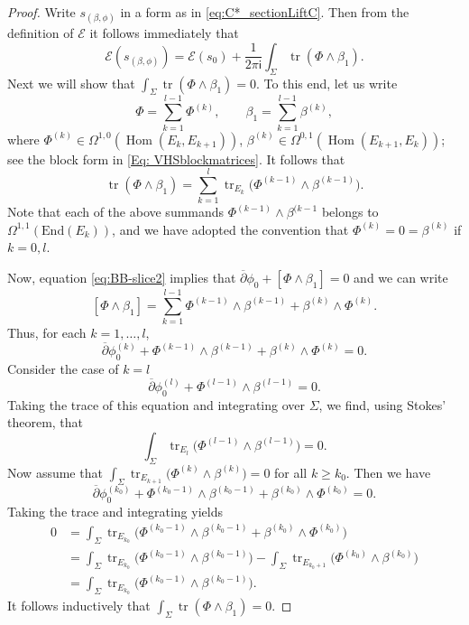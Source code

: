 \documentclass[pdftex]{sigma}
\numberwithin{equation}{section}
\theoremstyle{definition}
\renewcommand{\i}{\mathsf{i}}
\begin{document}
\begin{proof}
Write $s_{(\beta,\phi)}$ in a form as in \eqref{eq:C*_sectionLiftC}. Then from the definition of
$\mathcal{E}$ it follows immediately that
\[
\mathcal{E}(s_{(\beta,\phi)}) = \mathcal{E}(s_0)+\frac{1}{2\pi \i} \int_\Sigma \operatorname{tr}(\Phi \wedge \beta_1).
\]
Next we will show that $\int_\Sigma \operatorname{tr}(\Phi \wedge \beta_1) = 0$. To this end, let us write
\[
\Phi = \sum_{k=1}^{l-1}\Phi^{(k)},\qquad \beta_1 = \sum_{k=1}^{l-1}\beta^{(k)},
\]
where $\Phi^{(k)} \in \Omega^{1,0}(\operatorname{Hom}(E_k, E_{k+1}))$, $ \beta^{(k)} \in
\Omega^{0,1}(\operatorname{Hom}(E_{k+1}, E_k))$; see the block form in \eqref{Eq: VHSblockmatrices}. It follows that
\[
\operatorname{tr}(\Phi\wedge\beta_1) = \sum_{k=1}^l\operatorname{tr}_{E_k}\bigl(\Phi^{(k-1)}\wedge\beta^{(k-1)}\bigr).
\]
Note that each of the above summands $\Phi^{(k-1)}\wedge\beta^{(k-1}$ belongs to
$\Omega^{1,1}(\mathrm{End}(E_k))$, and we have adopted the convention that $\Phi^{(k)}
= 0 = \beta^{(k)}$ if $k = 0, l$.

Now, equation \eqref{eq:BB-slice2} implies that
$
{\overline{\partial}} \phi_0 + [\Phi\wedge\beta_{1}] = 0
$
and we can write
\[
[\Phi\wedge\beta_1] = \sum_{k=1}^{l-1}\Phi^{(k-1)}\wedge\beta^{(k-1)} + \beta^{(k)}\wedge\Phi^{(k)}.
\]
Thus, for each $k = 1, \dots, l$,
\[
{\overline{\partial}} \phi_0^{(k)} + \Phi^{(k-1)}\wedge\beta^{(k-1)} + \beta^{(k)}\wedge\Phi^{(k)} = 0.
\]
Consider the case of $k = l$
\[
{\overline{\partial}} \phi_0^{(l)} + \Phi^{(l-1)}\wedge\beta^{(l-1)} = 0.
\]
Taking the trace of this equation and integrating over $\Sigma$, we find, using Stokes' theorem,
that
\[
\int_\Sigma\operatorname{tr}_{E_l}\bigl(\Phi^{(l-1)}\wedge\beta^{(l-1)}\bigr) = 0.
\]
Now assume that $\int_\Sigma\operatorname{tr}_{E_{k+1}}\bigl(\Phi^{(k)}\wedge\beta^{(k)}\bigr) = 0$
for all $k \geq k_0$. Then we have
\[
{\overline{\partial}} \phi_0^{(k_0)} + \Phi^{(k_0-1)}\wedge\beta^{(k_0-1)} + \beta^{(k_0)}\wedge\Phi^{(k_0)} = 0.
\]
Taking the trace and integrating yields
\begin{align*}
0 &= \int_\Sigma\operatorname{tr}_{E_{k_0}}\bigl(\Phi^{(k_0-1)}\wedge\beta^{(k_0-1)} + \beta^{(k_0)}\wedge\Phi^{(k_0)}\bigr) \\
&= \int_\Sigma\operatorname{tr}_{E_{k_0}}\bigl(\Phi^{(k_0-1)}\wedge\beta^{(k_0-1)}\bigr) - \int_\Sigma\operatorname{tr}_{E_{k_0+1}}\bigl(\Phi^{(k_0)}\wedge\beta^{(k_0)}\bigr) \\
&= \int_\Sigma\operatorname{tr}_{E_{k_0}}\bigl(\Phi^{(k_0-1)}\wedge\beta^{(k_0-1)}\bigr).
\end{align*}
It follows inductively that $\int_\Sigma\operatorname{tr}(\Phi\wedge\beta_1) = 0$.


\end{proof}
\end{document}
